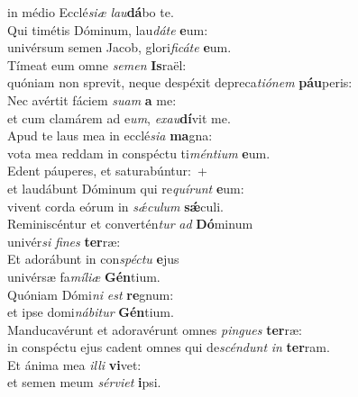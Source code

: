 \oddverse in médio Ecclé\textit{si}\textit{æ} \textit{lau}\textbf{dá}bo te.\\
\evenverse Qui timétis Dóminum, lau\textit{dá}\textit{te} \textbf{e}um:~\*\\
\evenverse univérsum semen Jacob, glori\textit{fi}\textit{cá}\textit{te} \textbf{e}um.\\
\oddverse Tímeat eum omne \textit{se}\textit{men} \textbf{Is}raël:~\*\\
\oddverse quóniam non sprevit, neque despéxit depreca\textit{ti}\textit{ó}\textit{nem} \textbf{páu}peris:\\
\evenverse Nec avértit fáciem \textit{su}\textit{am} \textbf{a} me:~\*\\
\evenverse et cum clamárem ad e\textit{um}, \textit{e}\textit{xau}\textbf{dí}vit me.\\
\oddverse Apud te laus mea in ecclé\textit{si}\textit{a} \textbf{ma}gna:~\*\\
\oddverse vota mea reddam in conspéctu ti\textit{mén}\textit{ti}\textit{um} \textbf{e}um.\\
\evenverse Edent páuperes, et saturabúntur:~+\\
\evenverse  et laudábunt Dóminum qui re\textit{quí}\textit{runt} \textbf{e}um:~\*\\
\evenverse vivent corda eórum in \textit{sǽ}\textit{cu}\textit{lum} \textbf{sǽ}culi.\\
\oddverse Reminiscéntur et convertén\textit{tur} \textit{ad} \textbf{Dó}minum~\*\\
\oddverse univér\textit{si} \textit{fi}\textit{nes} \textbf{ter}ræ:\\
\evenverse Et adorábunt in con\textit{spé}\textit{ctu} \textbf{e}jus~\*\\
\evenverse univérsæ fa\textit{mí}\textit{li}\textit{æ} \textbf{Gén}tium.\\
\oddverse Quóniam Dómi\textit{ni} \textit{est} \textbf{re}gnum:~\*\\
\oddverse et ipse domi\textit{ná}\textit{bi}\textit{tur} \textbf{Gén}tium.\\
\evenverse Manducavérunt et adoravérunt omnes \textit{pin}\textit{gues} \textbf{ter}ræ:~\*\\
\evenverse in conspéctu ejus cadent omnes qui de\textit{scén}\textit{dunt} \textit{in} \textbf{ter}ram.\\
\oddverse Et ánima mea \textit{il}\textit{li} \textbf{vi}vet:~\*\\
\oddverse et semen meum \textit{sér}\textit{vi}\textit{et} \textbf{i}psi.\\
